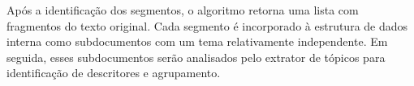 Após a identificação dos segmentos, o algoritmo retorna uma lista com fragmentos do texto original. Cada segmento é incorporado à estrutura de dados interna como subdocumentos com um tema relativamente independente. Em seguida, esses subdocumentos serão analisados pelo extrator de tópicos para identificação de descritores e agrupamento.





























